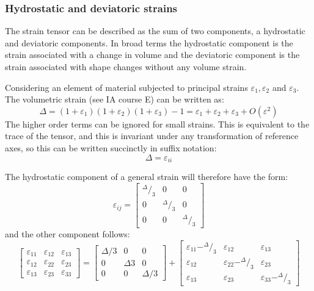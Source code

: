 \subsubsection{Hydrostatic and deviatoric strains}

The strain tensor can be described as the sum of two components, a hydrostatic and deviatoric components. In broad terms the hydrostatic component is the strain associated with a change in volume and the deviatoric component is the strain associated with shape changes without any volume strain.

Considering an element of material subjected to principal strains $\varepsilon_1, \varepsilon_2$ and $\varepsilon_3$. The volumetric strain (see IA course E) can be written as:
\begin{equation}
\Delta = (1+\varepsilon_1)(1+\varepsilon_2)(1+\varepsilon_3) -1 = \varepsilon_1 + \varepsilon_2 + \varepsilon_3 + O(\varepsilon^2)
\end{equation}
The higher order terms can be ignored for small strains. This is equivalent to the trace of the tensor, and this is invariant under any transformation of reference axes, so this can be written succinctly in suffix notation:
\begin{equation}
\Delta = \varepsilon_{ii}
\end{equation}

The hydrostatic component of a general strain will therefore have the form:
\begin{equation}
\varepsilon_{ij} = \begin{bmatrix}
^{\Delta}\!/_3 & 0 & 0 \\
0 & ^{\Delta}\!/_3 & 0 \\
0 & 0 & ^{\Delta}\!/_3
\end{bmatrix}
\end{equation}
and the other component follows:
\begin{equation}
\begin{bmatrix}
\varepsilon_{11} & \varepsilon_{12} & \varepsilon_{13} \\
\varepsilon_{12} & \varepsilon_{22} & \varepsilon_{23} \\
\varepsilon_{13} & \varepsilon_{23} & \varepsilon_{33}
\end{bmatrix}
= \begin{bmatrix}
\Delta/3 & 0 & 0 \\
0 & \Delta3 & 0 \\
0 & 0 & \Delta/3
\end{bmatrix}
+ \begin{bmatrix}
\varepsilon_{11} - ^{\Delta}\!/_3 & \varepsilon_{12} & \varepsilon_{13} \\
\varepsilon_{12} & \varepsilon_{22} - ^{\Delta}\!/_3 & \varepsilon_{23} \\
\varepsilon_{13} & \varepsilon_{23} & \varepsilon_{33} - ^{\Delta}\!/_3
\end{bmatrix}
\end{equation}

